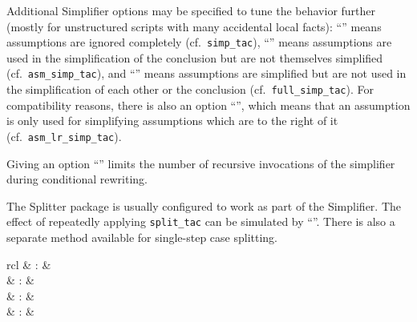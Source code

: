 \begin{isabellebody}
\begin{isamarkuptext}
  Additional Simplifier options may be specified to tune the behavior
  further (mostly for unstructured scripts with many accidental local
  facts): ``'' means assumptions are ignored
  completely (cf.\ \verb|simp_tac|), ``'' means
  assumptions are used in the simplification of the conclusion but are
  not themselves simplified (cf.\ \verb|asm_simp_tac|), and ``'' means assumptions are simplified but are not used
  in the simplification of each other or the conclusion (cf.\ \verb|full_simp_tac|).  For compatibility reasons, there is also an option
  ``'', which means that an assumption is only used
  for simplifying assumptions which are to the right of it (cf.\ \verb|asm_lr_simp_tac|).

  Giving an option ``'' limits the number of
  recursive invocations of the simplifier during conditional
  rewriting.

  \medskip The Splitter package is usually configured to work as part
  of the Simplifier.  The effect of repeatedly applying \verb|split_tac| can be simulated by ``''.  There is also a separate 
  method available for single-step case splitting.%
\end{isamarkuptext}%
\isamarkuptrue%
%
\isamarkuptrue%
%
\begin{isamarkuptext}%
\begin{matharray}{rcl}
    \hypertarget{command.print_simpset}{\hyperlink{command.print_simpset}{\mbox{}}}\isa{{\isachardoublequote}\isactrlsup {\isacharasterisk}{\isachardoublequote}} & : &  \\
    \hypertarget{attribute.simp}{\hyperlink{attribute.simp}{\mbox{}}} & : & \isaratt \\
    \hypertarget{attribute.cong}{\hyperlink{attribute.cong}{\mbox{}}} & : & \isaratt \\
    \hypertarget{attribute.split}{\hyperlink{attribute.split}{\mbox{}}} & : & \isaratt \\
  \end{matharray}


\end{isamarkuptext}
\end{isabellebody}
